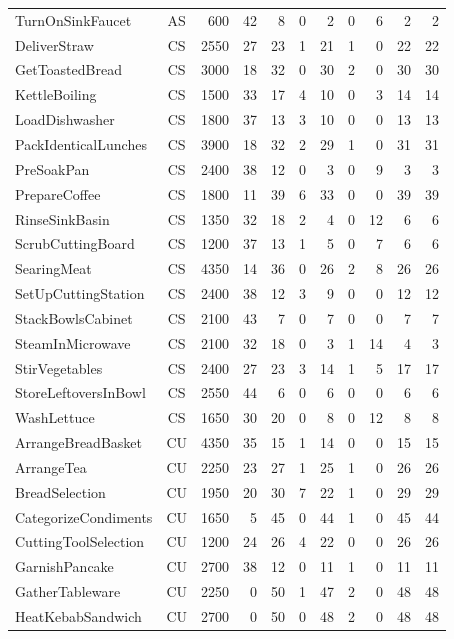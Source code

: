 \begin{longtable}{@{}lcrrrrrrrrr@{}}
TurnOnSinkFaucet & AS & 600 & 42 & 8 & 0 & 2 & 0 & 6 & 2 & 2 \\
DeliverStraw & CS & 2550 & 27 & 23 & 1 & 21 & 1 & 0 & 22 & 22 \\
GetToastedBread & CS & 3000 & 18 & 32 & 0 & 30 & 2 & 0 & 30 & 30 \\
KettleBoiling & CS & 1500 & 33 & 17 & 4 & 10 & 0 & 3 & 14 & 14 \\
LoadDishwasher & CS & 1800 & 37 & 13 & 3 & 10 & 0 & 0 & 13 & 13 \\
PackIdenticalLunches & CS & 3900 & 18 & 32 & 2 & 29 & 1 & 0 & 31 & 31 \\
PreSoakPan & CS & 2400 & 38 & 12 & 0 & 3 & 0 & 9 & 3 & 3 \\
PrepareCoffee & CS & 1800 & 11 & 39 & 6 & 33 & 0 & 0 & 39 & 39 \\
RinseSinkBasin & CS & 1350 & 32 & 18 & 2 & 4 & 0 & 12 & 6 & 6 \\
ScrubCuttingBoard & CS & 1200 & 37 & 13 & 1 & 5 & 0 & 7 & 6 & 6 \\
SearingMeat & CS & 4350 & 14 & 36 & 0 & 26 & 2 & 8 & 26 & 26 \\
SetUpCuttingStation & CS & 2400 & 38 & 12 & 3 & 9 & 0 & 0 & 12 & 12 \\
StackBowlsCabinet & CS & 2100 & 43 & 7 & 0 & 7 & 0 & 0 & 7 & 7 \\
SteamInMicrowave & CS & 2100 & 32 & 18 & 0 & 3 & 1 & 14 & 4 & 3 \\
StirVegetables & CS & 2400 & 27 & 23 & 3 & 14 & 1 & 5 & 17 & 17 \\
StoreLeftoversInBowl & CS & 2550 & 44 & 6 & 0 & 6 & 0 & 0 & 6 & 6 \\
WashLettuce & CS & 1650 & 30 & 20 & 0 & 8 & 0 & 12 & 8 & 8 \\
ArrangeBreadBasket & CU & 4350 & 35 & 15 & 1 & 14 & 0 & 0 & 15 & 15 \\
ArrangeTea & CU & 2250 & 23 & 27 & 1 & 25 & 1 & 0 & 26 & 26 \\
BreadSelection & CU & 1950 & 20 & 30 & 7 & 22 & 1 & 0 & 29 & 29 \\
CategorizeCondiments & CU & 1650 & 5 & 45 & 0 & 44 & 1 & 0 & 45 & 44 \\
CuttingToolSelection & CU & 1200 & 24 & 26 & 4 & 22 & 0 & 0 & 26 & 26 \\
GarnishPancake & CU & 2700 & 38 & 12 & 0 & 11 & 1 & 0 & 11 & 11 \\
GatherTableware & CU & 2250 & 0 & 50 & 1 & 47 & 2 & 0 & 48 & 48 \\
HeatKebabSandwich & CU & 2700 & 0 & 50 & 0 & 48 & 2 & 0 & 48 & 48 \\

\end{longtable}
